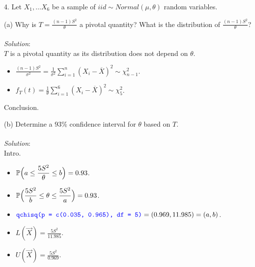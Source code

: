 \documentclass[12pt]{article}
\newcommand{\XB}{\color{black}}
\newcommand{\XBB}{\color{blue}}
\newcommand{\ds}{\displaystyle}
\begin{document}
4. Let $ X_{1}, \dots X_{6} $ be a sample of $ iid \sim Normal(\mu, \theta) $ random variables. \\

\XBB\hrulefill\XB
\vspace{5mm}

(a) Why is $ \ds T = \frac{(n-1)S^{2}}{\theta} $ a pivotal quantity?
What is the distribution of $ \ds \frac{(n-1)S^{2}}{\theta} $? \\
\vspace{2.5mm} \\
\textit{Solution}:
\vspace{2.5mm} \\

\noindent
$ T $ is a pivotal quantity as its distribution does not depend on $ \theta $.

\begin{itemize}
    \item $ \ds \frac{(n-1)S^{2}}{\sigma^{2}} = \frac{1}{\sigma^{2}} \sum_{i=1}^{n} (X_{i} - \overline{X})^{2} \sim \chi_{n-1}^{2}  $. \\
    \item $ \ds f_{T}(t) = \frac{1}{\theta} \sum_{i=1}^{6} (X_{i} - \overline{X})^{2} \sim \chi_{5}^{2}  $. \\
\end{itemize}
\noindent
Conclusion. \\

\vspace{2.5mm}

(b) Determine a $ 93\% $ confidence interval for $ \theta $ based on $ T $. \\
\vspace{2.5mm} \\
\textit{Solution}:
\vspace{2.5mm} \\

\noindent
Intro. \\

\begin{itemize}
    \item $ \ds \mathbb{P} \Bigl( a \le \frac{5S^{2}}{\theta} \le b \Bigr) = 0.93 $. \\
    \item $ \ds \mathbb{P} \Bigl( \frac{5S^{2}}{b} \le \theta \le \frac{5S^{2}}{a} \Bigr) = 0.93 $. \\
    \item $ \ds {\XBB \texttt{qchisq(p = c(0.035, 0.965), df = 5)}} = (0.969, 11.985) = (a, b) $.
    \item $ \ds L(\overrightarrow{X}) = \frac{5S^{2}}{11.985} $. \\
    \item $ \ds U(\overrightarrow{X}) = \frac{5S^{2}}{0.969} $. \\
\end{itemize}
\end{document}
